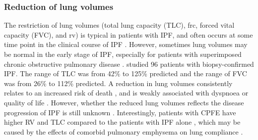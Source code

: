 \subsubsection{Reduction of lung volumes}
The restriction of lung volumes (total lung capacity (TLC), \gls{frc}, forced vital capacity (FVC), and \gls{rv}) is typical in patients with IPF, and often occurs at some time point in the clinical course of IPF \citep{american2000idiopathic, plantier2018physiology}. However, sometimes lung volumes may be normal in the early stage of IPF, especially for patients with superimposed chronic obstructive pulmonary disease \citep{martinez2006pulmonary}. \cite{cherniack1995correlation} studied 96 patients with biopsy-confirmed IPF. The range of TLC was from 42\% to 125\% predicted and the range of FVC was from 26\% to 112\% predicted. A reduction in lung volumes consistently relates to an increased risk of death \citep{martinez2006pulmonary}, and is weakly associated with dyspnoea or quality of life \citep{du2011ascertainment}. However, whether the reduced lung volumes reflects the disease progression of IPF is still unknown \citep{plantier2018physiology}. Interestingly, patients with CPFE have higher RV and TLC compared to the patients with IPF alone \citep{mura2006presence}, which may be caused by the effects of comorbid pulmonary emphysema on lung compliance \citep{doherty1997cryptogenic}.

